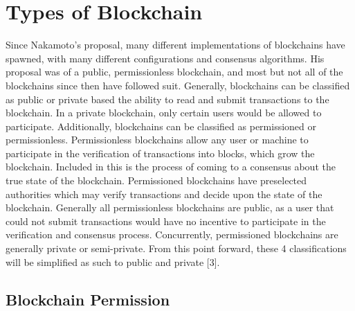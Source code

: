 \documentclass[11pt]{article}
\begin{document}
\section{Types of Blockchain}
\label{sec:orgd9ecf57}
Since Nakamoto's proposal, many different implementations of blockchains have spawned, with many different configurations and consensus algorithms. His proposal was of a public, permissionless blockchain, and most but not all of the blockchains since then have followed suit. Generally, blockchains can be classified as public or private based the ability to read and submit transactions to the blockchain. In a private blockchain, only certain users would be allowed to participate. Additionally, blockchains can be classified as permissioned or permissionless. Permissionless blockchains allow any user or machine to participate in the verification of transactions into blocks, which grow the blockchain. Included in this is the process of coming to a consensus about the true state of the blockchain. Permissioned blockchains have preselected authorities which may verify transactions and decide upon the state of the blockchain. Generally all permissionless blockchains are public, as a user that could not submit transactions would have no incentive to participate in the verification and consensus process. Concurrently, permissioned blockchains are generally private or semi-private. From this point forward, these 4 classifications will be simplified as such to public and private [3].
\subsection{Blockchain Permission}
\label{sec:orgc1837f8}
\end{document}
